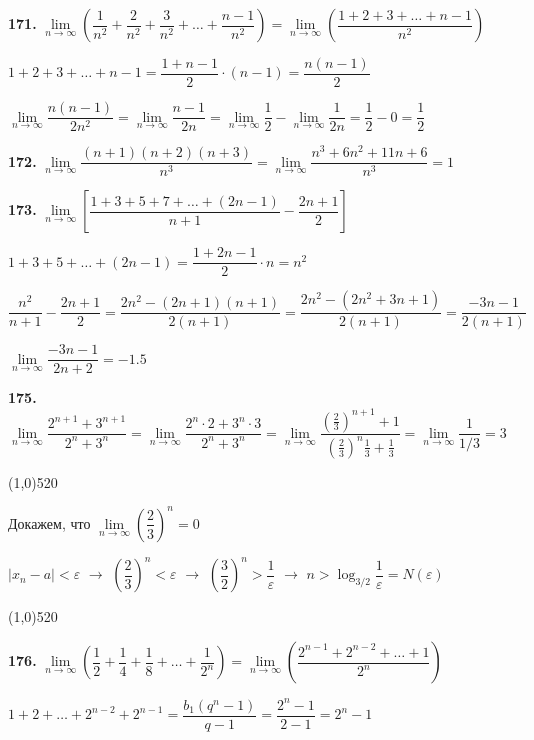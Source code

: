 \documentclass[12pt]{article}
\begin{document}
	{\bf 171.} $\lim\limits_{n\to\infty} \left(\dfrac{1}{n^2}+\dfrac{2}{n^2}+\dfrac{3}{n^2}+\dots+\dfrac{n-1}{n^2}\right) = \lim\limits_{n\to \infty} \left(\dfrac{1+2+3+\dots+n-1}{n^2}\right)$
	
	$
	1+2+3+\dots+n-1 = \dfrac{1+n-1}{2}\cdot(n-1) = \dfrac{n(n-1)}{2}
	$
	
	$
	\lim\limits_{n\to \infty} \dfrac{n(n-1)}{2n^2} = \lim\limits_{n\to\infty} \dfrac{n-1}{2n} = \lim\limits_{n\to\infty} \dfrac{1}{2} - \lim\limits_{n\to\infty}\dfrac{1}{2n} = \dfrac{1}{2} - 0 = \dfrac{1}{2}
	$
	
	\medskip
	{\bf 172.} $\lim\limits_{n\to\infty}\dfrac{(n+1)(n+2)(n+3)}{n^3} = \lim\limits_{n\to\infty} \dfrac{n^3+6n^2+11n+6}{n^3} = 1$
	
	\medskip
	{\bf 173.} $\lim\limits_{n\to\infty} \left[\dfrac{1+3+5+7+\dots+(2n-1)}{n+1} - \dfrac{2n+1}{2}\right]$
	
	\medskip
	$1+3+5+\dots+(2n-1) = \dfrac{1+2n-1}{2}\cdot n = n^2$
	
	$\dfrac{n^2}{n+1}-\dfrac{2n+1}{2} = \dfrac{2n^2-(2n+1)(n+1)}{2(n+1)} = \dfrac{2n^2-(2n^2+3n+1)}{2(n+1)} = \dfrac{-3n-1}{2(n+1)}$
	
	$
	\lim\limits_{n\to\infty} \dfrac{-3n-1}{2n+2} = -1.5
	$
	
	\medskip
	{\bf 175.} $\lim\limits_{n\to\infty} \dfrac{2^{n+1}+3^{n+1}}{2^n+3^n} =\lim\limits_{n\to\infty} \dfrac{2^n\cdot2+3^n\cdot3}{2^n+3^n} = \lim\limits_{n\to\infty} \dfrac{\left(\frac{2}{3}\right)^{n+1}+1}{\left(\frac{2}{3}\right)^n\frac{1}{3}+\frac{1}{3}} = \lim\limits_{n\to\infty} \dfrac{1}{1/3} = 3$
	
	\line(1,0){520}\vspace{2mm}
	
	Докажем, что $\lim\limits_{n\to \infty} \left(\dfrac{2}{3}\right)^n =0$\medskip
	
	$|x_n-a|<\varepsilon$ $\longrightarrow$ $\left(\dfrac{2}{3}\right)^n < \varepsilon$ $\longrightarrow$ $\left(\dfrac{3}{2}\right)^n > \dfrac{1}{\varepsilon}$ $\longrightarrow$ $n>\log_{3/2} \dfrac{1}{\varepsilon} = N(\varepsilon)$
	
	\line(1,0){520}
	
	
	\medskip
	{\bf 176.} $\lim\limits_{n\to\infty}\left(\dfrac{1}{2}+\dfrac{1}{4}+\dfrac{1}{8}+\dots+\dfrac{1}{2^n}\right) = \lim\limits_{n\to\infty}\left(\dfrac{2^{n-1}+2^{n-2}+\dots+1}{2^n}\right)$
	
	$1+2+\dots+2^{n-2}+2^{n-1} = \dfrac{b_1(q^{n}-1)}{q-1} = \dfrac{2^{n}-1}{2-1} = 2^{n}-1$
	
\end{document}
